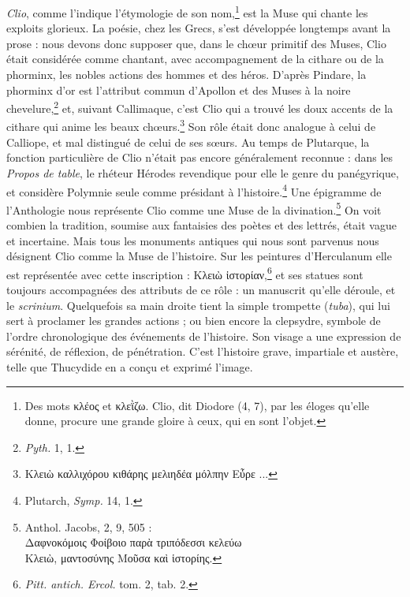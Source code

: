 \documentclass[landscape, a4paper, 11pt, oneside, polutonikogreek, french]{article}
\begin{document}
\emph{Clio}, comme l'indique l'étymologie de son nom,\footnote{Des mots κλέος et κλεῒζω. Clio, dit Diodore (4, 7), par les éloges qu'elle donne, procure une grande gloire à ceux, qui en sont l'objet.} est la Muse qui chante les exploits glorieux. La poésie, chez les Grecs, s'est développée longtemps avant la prose : nous devons donc supposer que, dans le chœur primitif des Muses, Clio était considérée comme chantant, avec accompagnement de la cithare ou de la phorminx, les nobles actions des hommes et des héros. D'après Pindare, la phorminx d'or est l'attribut commun d'Apollon et des Muses à la noire chevelure,\footnote{\emph{Pyth.} 1, 1.} et, suivant Callimaque, c'est Clio qui a trouvé les doux accents de la cithare qui anime les beaux chœurs.\footnote{Κλειὼ καλλιχόρου κιθάρης μελιηδέα μόλπην Εὖρε ...} Son rôle était donc analogue à celui de Calliope, et mal distingué de celui de ses sœurs. Au temps de Plutarque, la fonction particulière de Clio n'était pas encore généralement reconnue : dans les \emph{Propos de table}, le rhéteur Hérodes revendique pour elle le genre du panégyrique, et considère Polymnie seule comme présidant à l'histoire.\footnote{Plutarch, \emph{Symp.} 14, 1.} Une épigramme de l'Anthologie nous représente Clio comme une Muse de la divination.\footnote{Anthol. Jacobs, 2, 9, 505 :\\\hspace*{5mm}Δαφνοκόμοις Φοίβοιο παρὰ τριπόδεσσι κελεύω\\\hspace*{5mm}Κλειὼ, μαντοσύνης Μοῦσα καὶ ἱστορίης.} On voit combien la tradition, soumise aux fantaisies des poètes et des lettrés, était vague et incertaine. Mais tous les monuments antiques qui nous sont parvenus nous désignent Clio comme la Muse de l'histoire. Sur les peintures d'Herculanum elle est représentée avec cette inscription : Κλειὼ ἱστορίαν,\footnote{\emph{Pitt. antich. Ercol.} tom. 2, tab. 2.} et ses statues sont toujours accompagnées des attributs de ce rôle : un manuscrit qu'elle déroule, et le \emph{scrinium}. Quelquefois sa main droite tient la simple trompette (\emph{tuba}), qui lui sert à proclamer les grandes actions ; ou bien encore la clepsydre, symbole de l'ordre chronologique des événements de l'histoire. Son visage a une expression de sérénité, de réflexion, de pénétration. C'est l'histoire grave, impartiale et austère, telle que Thucydide en a conçu et exprimé l'image.
\end{document}
